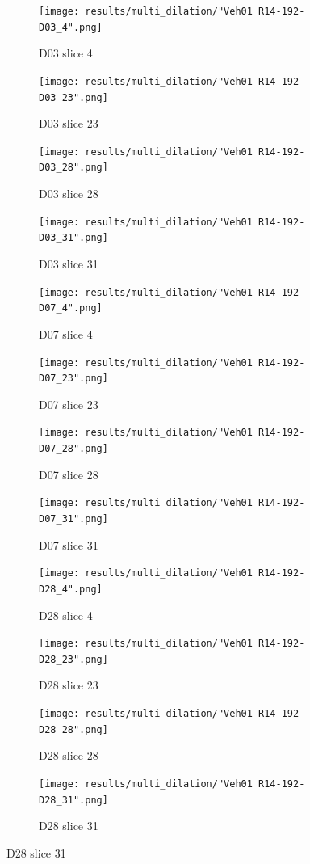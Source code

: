 \begin{figure}[!htb]  
    \centering %
\begin{subfigure}{0.25\textwidth}
  \texttt{[image: results/multi\_dilation/"Veh01 R14-192-D03\_4".png]}
  \caption{D03 slice 4}
\end{subfigure}\hfil %
\begin{subfigure}{0.25\textwidth}
  \texttt{[image: results/multi\_dilation/"Veh01 R14-192-D03\_23".png]}
  \caption{D03 slice 23}
\end{subfigure}\hfil %
\begin{subfigure}{0.25\textwidth}
  \texttt{[image: results/multi\_dilation/"Veh01 R14-192-D03\_28".png]}
  \caption{D03 slice 28}
\end{subfigure}\hfil %
\begin{subfigure}{0.25\textwidth}
  \texttt{[image: results/multi\_dilation/"Veh01 R14-192-D03\_31".png]}
  \caption{D03 slice 31}
\end{subfigure}

\medskip
\begin{subfigure}{0.25\textwidth}
  \texttt{[image: results/multi\_dilation/"Veh01 R14-192-D07\_4".png]}
  \caption{D07 slice 4}
\end{subfigure}\hfil %
\begin{subfigure}{0.25\textwidth}
  \texttt{[image: results/multi\_dilation/"Veh01 R14-192-D07\_23".png]}
  \caption{D07 slice 23}
\end{subfigure}\hfil %
\begin{subfigure}{0.25\textwidth}
  \texttt{[image: results/multi\_dilation/"Veh01 R14-192-D07\_28".png]}
  \caption{D07 slice 28}
\end{subfigure}\hfil %
\begin{subfigure}{0.25\textwidth}
  \texttt{[image: results/multi\_dilation/"Veh01 R14-192-D07\_31".png]}
  \caption{D07 slice 31}
\end{subfigure}

\medskip
\begin{subfigure}{0.25\textwidth}
  \texttt{[image: results/multi\_dilation/"Veh01 R14-192-D28\_4".png]}
  \caption{D28 slice 4}
\end{subfigure}\hfil %
\begin{subfigure}{0.25\textwidth}
  \texttt{[image: results/multi\_dilation/"Veh01 R14-192-D28\_23".png]}
  \caption{D28 slice 23}
\end{subfigure}\hfil %
\begin{subfigure}{0.25\textwidth}
  \texttt{[image: results/multi\_dilation/"Veh01 R14-192-D28\_28".png]}
  \caption{D28 slice 28}
\end{subfigure}\hfil %
\begin{subfigure}{0.25\textwidth}
  \texttt{[image: results/multi\_dilation/"Veh01 R14-192-D28\_31".png]}
  \caption{D28 slice 31}
\end{subfigure}
  

\end{figure}
